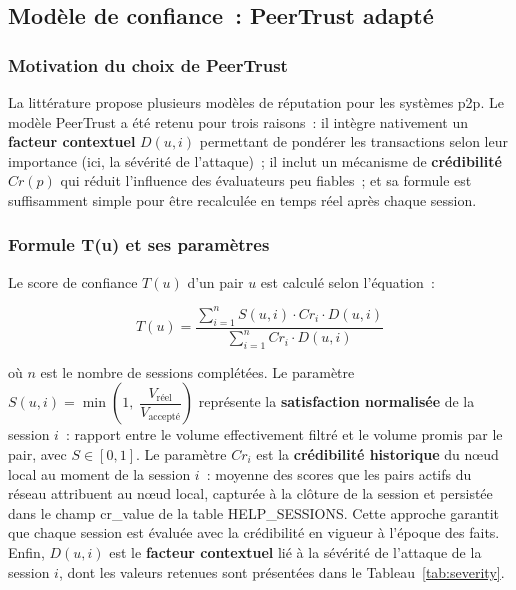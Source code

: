 \subsection{Modèle de confiance~: PeerTrust adapté}
\label{sec:trust}

\subsubsection{Motivation du choix de PeerTrust}

La littérature propose plusieurs modèles de réputation pour les systèmes \gls{p2p}. Le modèle PeerTrust \parencite{xiong2004peertrust} a été retenu pour trois raisons~: il intègre nativement un \textbf{facteur contextuel} $D(u,i)$ permettant de pondérer les transactions selon leur importance (ici, la sévérité de l'attaque)~; il inclut un mécanisme de \textbf{crédibilité} $Cr(p)$ qui réduit l'influence des évaluateurs peu fiables~; et sa formule est suffisamment simple pour être recalculée en temps réel après chaque session.

\subsubsection{Formule T(u) et ses paramètres}

Le score de confiance $T(u)$ d'un pair $u$ est calculé selon l'équation~:

\begin{equation}
\label{eq:trust}
T(u) = \frac{\displaystyle\sum_{i=1}^{n} S(u,i) \cdot Cr_i \cdot D(u,i)}
            {\displaystyle\sum_{i=1}^{n} Cr_i \cdot D(u,i)}
\end{equation}

où $n$ est le nombre de sessions complétées. Le paramètre $S(u,i) = \min\!\left(1,\;\dfrac{V_{\text{réel}}}{V_{\text{accepté}}}\right)$ représente la \textbf{satisfaction normalisée} de la session $i$~: rapport entre le volume effectivement filtré et le volume promis par le pair, avec $S \in [0,1]$. Le paramètre $Cr_i$ est la \textbf{crédibilité historique} du nœud local au moment de la session $i$~: moyenne des scores que les pairs actifs du réseau attribuent au nœud local, capturée à la clôture de la session et persistée dans le champ {cr\_value} de la table {HELP\_SESSIONS}. Cette approche garantit que chaque session est évaluée avec la crédibilité en vigueur à l'époque des faits. Enfin, $D(u,i)$ est le \textbf{facteur contextuel} lié à la sévérité de l'attaque de la session $i$, dont les valeurs retenues sont présentées dans le Tableau~\ref{tab:severity}.

